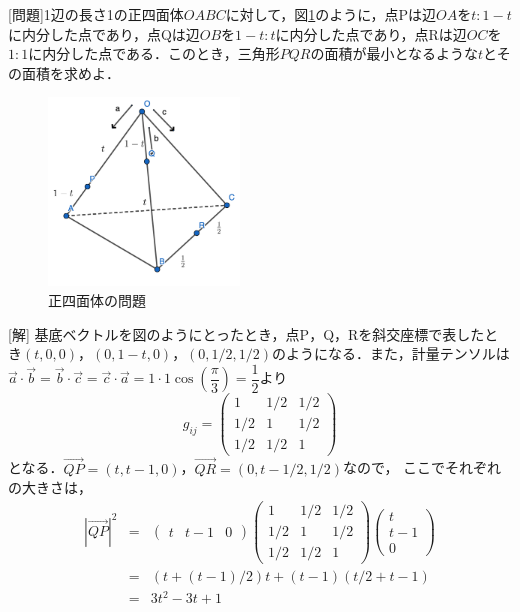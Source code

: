 \documentclass[dvipdfmx,a4]{jsarticle}
\begin{document}
[問題]1辺の長さ1の正四面体\(OABC\)に対して，図\ref{fig2}のように，点Pは辺\(OA\)を\(t:1-t\)に内分した点であり，点Qは辺\(OB\)を\(1-t:t\)に内分した点であり，点Rは辺\(OC\)を\(1:1\)に内分した点である．このとき，三角形\(PQR\)の面積が最小となるような\(t\)とその面積を求めよ．
\begin{figure}[tbh]
  \centering
  \includegraphics[height=5cm]{fig/fig2.png}
  \caption{正四面体の問題}
  \label{fig2}
\end{figure}

[解]
基底ベクトルを図のようにとったとき，点P，Q，Rを斜交座標で表したとき\((t,0,0)\)，\((0,1-t,0)\)，\((0,1/2,1/2)\)のようになる．また，計量テンソルは\(\vec{a}\cdot \vec{b}=\vec{b}\cdot \vec{c}=\vec{c}\cdot \vec{a}=1\cdot 1\cos \left( \dfrac{\pi}{3} \right) = \dfrac{1}{2} \)より
\begin{equation*}
  g_{ij}=
  \begin{pmatrix}
    1   & 1/2 & 1/2 \\
    1/2 & 1   & 1/2 \\
    1/2 & 1/2 & 1
  \end{pmatrix}
\end{equation*}
となる．\(\overrightarrow{QP} = (t, t-1, 0)\)，\(\overrightarrow{QR} = (0, t-1/2, 1/2)\)なので，
ここでそれぞれの大きさは，
\begin{eqnarray*}
  |\overrightarrow{QP}| ^2
  &=&
  \begin{pmatrix}
    t & t-1 & 0
  \end{pmatrix}
  \begin{pmatrix}
    1   & 1/2 & 1/2 \\
    1/2 & 1   & 1/2 \\
    1/2 & 1/2 & 1
  \end{pmatrix}
  \begin{pmatrix}
    t   \\
    t-1 \\
    0
  \end{pmatrix}\\
  &=&
  (t+(t-1)/2)t+(t-1)(t/2+t-1)\\
  &=&
  3t^2 -3t +1
\end{eqnarray*}
\end{document}
